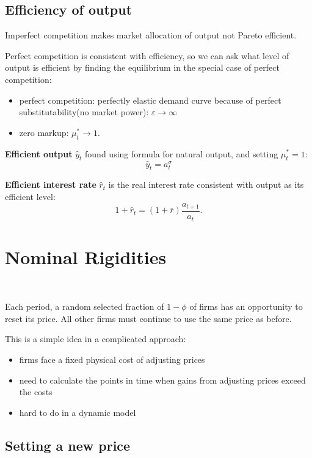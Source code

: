 \subsection{Efficiency of output}

Imperfect competition makes market allocation of output not Pareto efficient.

Perfect competition is consistent with efficiency, so we can ask what level of output is efficient by 
finding the equilibrium in the special case of perfect competition:
\begin{itemize}
    \item perfect competition: perfectly elastic demand curve because of perfect substitutability(no market power): $\varepsilon \to \infty$
    \item zero markup: $\mu_t^* \to 1$.
\end{itemize}

\textbf{Efficient output} $\hat{y}_t$ found using formula for natural output, and setting $\mu_t^* = 1$:
\[
\hat{y}_t = a_t^{\sigma}
\]

\textbf{Efficient interest rate} $\hat{r}_t$ is the real interest rate consistent with output as its efficient level:
\[
1 + \hat{r}_t = (1+\bar{r}) \frac{a_{t+1}}{a_t}.
\]

\section{Nominal Rigidities}

\begin{assumption}
    \ 

    Each period, a random selected fraction of $1-\phi$ of firms has an opportunity to reset its price.
    All other firms must continue to use the same price as before.

    This is a simple idea in a complicated approach:
    \begin{itemize}
        \item firms face a fixed physical cost of adjusting prices
        \item need to calculate the points in time when gains from adjusting prices exceed the costs
        \item hard to do in a dynamic model
    \end{itemize}
\end{assumption}

\subsection{Setting a new price}

